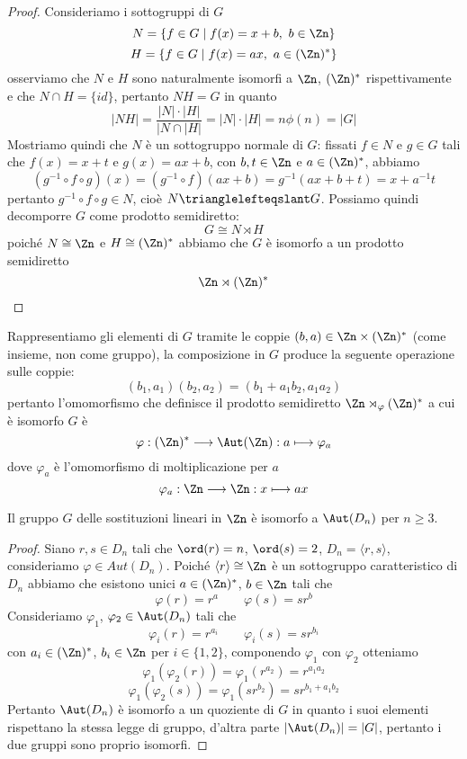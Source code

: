\documentclass[11pt]{scrartcl}
\begin{document}
	\begin{proof}
		Consideriamo i sottogruppi di $G$
		\[
		N = \{f \in G\mid f(x) = x + b,~b \in \Zn\}
		\]
		\[
		H = \{f \in G\mid f(x) = ax,~a \in (\Zn)^*\}
		\]
		osserviamo che $N$ e $H$ sono naturalmente isomorfi a $\Zn$, $(\Zn)^*$ 
		rispettivamente e che $N \cap H = \{id\}$, pertanto $NH = G$ in quanto 
		\[
		|NH| = \frac{|N|\cdot|H|}{|N\cap|H|} = |N|\cdot|H| = n\phi(n) = |G|
		\]
		Mostriamo quindi che $N$ è un sottogruppo normale di $G$: fissati $f \in N$
		e $g \in G$ tali che $f(x) = x + t$ e $g(x) = ax + b$, con $b, t \in \Zn$ e 
		$a \in (\Zn)^*$, abbiamo
		\[
		(g^{-1}\circ f \circ g)(x) = (g^{-1}\circ f)(ax + b) = g^{-1}(ax + b + t) = 
		x + a^{-1}t
		\]
		pertanto $g^{-1}\circ f\circ g \in N$, cioè $N\trianglelefteqslant G$.
		Possiamo quindi decomporre $G$ come prodotto semidiretto:
		\[
		G \cong N\rtimes H
		\]
		poiché $N \cong \Zn$ e $H \cong (\Zn)^*$ abbiamo che $G$ è isomorfo a un
		prodotto semidiretto 
		\[
		\Zn \rtimes (\Zn)^*
		\]
	\end{proof}
	
	Rappresentiamo gli elementi di $G$ tramite le coppie $(b, a) \in \Zn\times (\Zn)^*$
	(come insieme, non come gruppo),
	la composizione in $G$ produce la seguente operazione sulle coppie:
	\[
	(b_1, a_1)(b_2, a_2) = (b_1 + a_1b_2, a_1a_2)
	\]
	pertanto l'omomorfismo che definisce il prodotto semidiretto $\Zn \rtimes_{\varphi}(\Zn)^*$
	a cui è isomorfo $G$ è 
	\[
	\varphi: (\Zn)^* \longrightarrow \Aut(\Zn): a \longmapsto \varphi_a
	\]
	dove $\varphi_a$ è l'omomorfismo di moltiplicazione per $a$
	\[
	\varphi_a :\Zn \longrightarrow \Zn: x \longmapsto ax
	\]
	
	\begin{proposition}
		Il gruppo $G$ delle sostituzioni lineari in $\Zn$ è isomorfo a $\Aut(D_n)$
		per $n \geq 3$.
	\end{proposition}
	
	\begin{proof}
		Siano $r, s \in D_n$ tali che $\ord(r) = n$, $\ord(s) = 2$, $D_n = \langle r, s\rangle$,
		consideriamo $\varphi \in Aut(D_n)$. Poiché $\langle r\rangle \cong \Zn$ è un 
		sottogruppo caratteristico di $D_n$ abbiamo che esistono unici $a \in (\Zn)^*$,
		$b \in \Zn$ tali che 
		\[
		\varphi(r) = r^a\qquad \varphi(s) = sr^b
		\]
		Consideriamo $\varphi_1$, $\varphi_2 \in \Aut(D_n)$ tali che
		\[
		\varphi_i(r) = r^{a_i} \qquad \varphi_i(s) = sr^{b_i}
		\]
		con $a_i \in (\Zn)^*$, $b_i \in \Zn$ per $i \in \{1, 2\}$, componendo
		$\varphi_1$ con $\varphi_2$ otteniamo
		\[
		\varphi_1(\varphi_2(r)) = \varphi_1(r^{a_2}) = r^{a_1a_2}
		\]
		\[
		\varphi_1(\varphi_2(s)) = \varphi_1(sr^{b_2}) = sr^{b_1 + a_1b_2}
		\]
		Pertanto $\Aut(D_n)$ è isomorfo a un quoziente di $G$ in quanto i suoi
		elementi rispettano la stessa legge di gruppo, d'altra parte $|\Aut(D_n)| = |G|$,
		pertanto i due gruppi sono proprio isomorfi.
	\end{proof}
	
\end{document}
